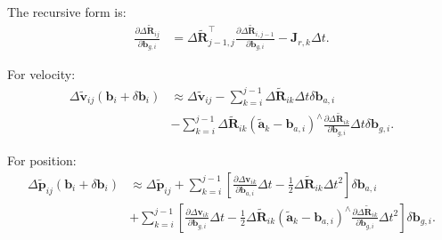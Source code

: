 The recursive form is:
\begin{equation}\label{key}
	\begin{aligned}
		\frac{\partial \Delta \tilde{\mathbf{R}}_{ij}}{\partial \mathbf{b}_{g,i}} &= \Delta \tilde{\mathbf{R}}_{j-1, 
			j}^\top \frac{\partial \Delta \tilde{\mathbf{R}}_{i,j-1}}{\partial \mathbf{b}_{g,i}} - \mathbf{J}_{r,k} \Delta 
		t.
	\end{aligned}
\end{equation}

For velocity:
\begin{equation}\label{key}
	\begin{aligned}
		\Delta \tilde{\mathbf{v}}_{ij}(\mathbf{b}_i + \delta \mathbf{b}_i) &\approx \Delta \tilde{\mathbf{v}}_{ij} - \sum_{k=i}^{j-1} \Delta \tilde{\mathbf{R}}_{ik} \Delta t \delta 
		\mathbf{b}_{a,i} \\
		&- \sum_{k=i}^{j-1} \Delta \tilde{\mathbf{R}}_{ik} (\tilde{\mathbf{a}}_k - \mathbf{b}_{a,i})^\wedge 
		\frac{\partial \Delta \tilde{\mathbf{R}}_{ik}}{\partial \mathbf{b}_{g,i}} \Delta t \delta \mathbf{b}_{g,i}.
	\end{aligned}
\end{equation}

For position:
\begin{equation}
	\begin{aligned}
		\Delta \tilde{\mathbf{p}}_{ij}(\mathbf{b}_i + \delta \mathbf{b}_i) &\approx \Delta \tilde{\mathbf{p}}_{ij} + \sum_{k=i}^{j-1}\left[\frac{\partial \Delta \mathbf{v}_{ik}}{\partial 
			\mathbf{b}_{a,i}}  \Delta t - \frac{1}{2} \Delta \tilde{\mathbf{R}}_{ik} \Delta t^2 \right] \delta \mathbf{b}_{a,i} \\
		&+ \sum_{k=i}^{j-1} \left[\frac{\partial \Delta \mathbf{v}_{ik}}{\partial \mathbf{b}_{g,i}} 
		\Delta t -\frac{1}{2} \Delta \tilde{\mathbf{R}}_{ik}\left(\tilde{\mathbf{a}}_{k}-\mathbf{b}_{a,i}\right)^\wedge  
		\frac{\partial \Delta \tilde{\mathbf{R}}_{ik}}{\partial \mathbf{b}_{g,i}} \Delta t^2 \right] \delta \mathbf{b}_{g,i}.
	\end{aligned}
\end{equation}

